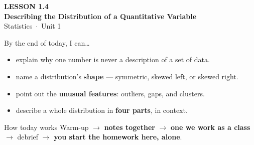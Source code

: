 \documentclass[aspectratio=169, 11pt]{beamer}
\begin{document}
{
\begin{frame}[plain]
  \vspace{2.8cm}\hspace{0.55cm}%
  \begin{minipage}{0.9\textwidth}
    {\color{goldacc}\bfseries\small LESSON 1.4}\\[0.5cm]
    {\color{white}\bfseries\LARGE Describing the Distribution of a Quantitative Variable}\\[1.2cm]
    {\color{skymid}\small Statistics~$\cdot$~Unit 1}
  \end{minipage}
\end{frame}
}

\newcommand{\redink}[1]{{\color{redacc}\bfseries #1}}

\begin{frame}[t, plain]
  By the end of today, I can\ldots
  \begin{itemize}\setlength{\itemsep}{5pt}
    \item explain why one number is never a description of a set of data.
    \item name a distribution's \textbf{shape} --- symmetric, skewed left, or skewed right.
    \item point out the \textbf{unusual features}: outliers, gaps, and clusters.
    \item describe a whole distribution in \textbf{four parts}, in context.
  \end{itemize}
  \begin{block}{How today works}
    Warm-up $\to$ \textbf{notes together} $\to$ \textbf{one we work as a class} $\to$
    debrief $\to$ \textbf{you start the homework here, alone}.
  \end{block}
\end{frame}
\end{document}
